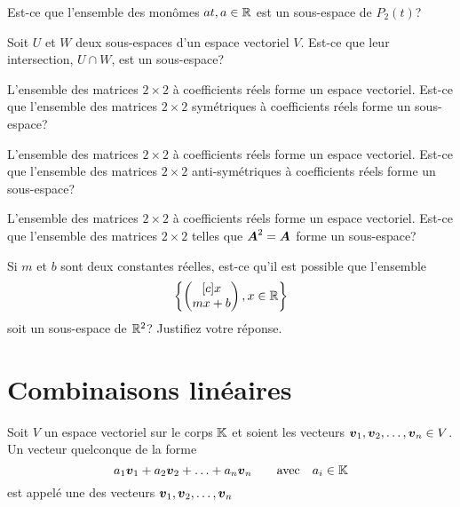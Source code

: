 \begin{exerciceC}
Est-ce que l'ensemble des monômes $at, a\in \mathbb{R}$ est un sous-espace de $P_2(t)$?
\end{exerciceC}
\begin{exerciceC}
Soit $U$ et $W$ deux sous-espaces d'un espace vectoriel $V$.  Est-ce que leur intersection,
$U \cap W$, est un sous-espace?
\end{exerciceC}
\begin{exerciceC}
L'ensemble des matrices $2\times 2$ à coefficients réels forme un espace vectoriel.  Est-ce que l'ensemble
des matrices $2\times 2$ symétriques à coefficients réels forme un sous-espace?
\end{exerciceC}
\begin{exerciceC}
L'ensemble des matrices $2\times 2$ à coefficients réels forme un espace vectoriel.  Est-ce que l'ensemble
des matrices $2\times 2$ anti-symétriques à coefficients réels forme un sous-espace?
\end{exerciceC}
\begin{exerciceC}
L'ensemble des matrices $2\times 2$ à coefficients réels forme un espace vectoriel.  Est-ce que l'ensemble
des matrices $2\times 2$ telles que $\boldsymbol{A}^2 = \boldsymbol{A}$ forme un sous-espace?  
\end{exerciceC}
\begin{exerciceC}
Si $m$ et $b$ sont deux constantes réelles, est-ce qu'il est possible que l'ensemble
\[
\left\{ \begin{pmatrix}[c]
x \\
mx+b
\end{pmatrix}
, x\in\mathbb{R} \right\}
\]
soit un sous-espace de $\mathbb{R}^2$?   Justifiez votre réponse.
\end{exerciceC}

\section{Combinaisons linéaires}

\begin{defini}
Soit $V$ un espace vectoriel sur le corps $\mathbb{K}$ et soient les vecteurs $\boldsymbol{v}_1,\boldsymbol{v}_2, \ldots, \boldsymbol{v}_n \in V$.
Un vecteur quelconque de la forme 
\[
a_1 \boldsymbol{v}_1 + a_2 \boldsymbol{v}_2 + \ldots + a_n \boldsymbol{v}_n \qquad \mbox{avec} \quad a_i \in \mathbb{K}
\]
est appelé une  des vecteurs $\boldsymbol{v}_1,\boldsymbol{v}_2, \ldots, \boldsymbol{v}_n$
\end{defini}

